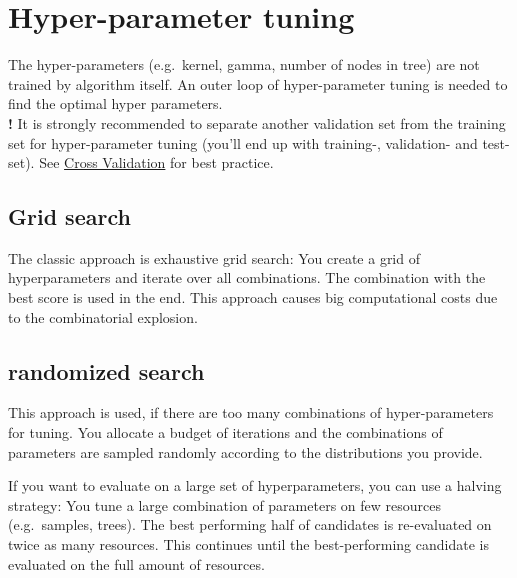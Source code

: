 \documentclass[
]{book}
\begin{document}
\hypertarget{hyper-parameter-tuning}{%
\section{Hyper-parameter tuning}\label{hyper-parameter-tuning}}

The hyper-parameters (e.g.~kernel, gamma, number of nodes in tree) are
not trained by algorithm itself. An outer loop of hyper-parameter tuning
is needed to find the optimal hyper parameters.\\
\textbf{!} It is strongly recommended to separate another validation set from
the training set for hyper-parameter tuning (you'll end up with
training-, validation- and test-set). See \protect\hyperlink{crossval}{Cross Validation}
for best practice.

\hypertarget{grid-search}{%
\subsection{Grid search}\label{grid-search}}

The classic approach is exhaustive grid search: You create a grid of
hyperparameters and iterate over all combinations. The combination with
the best score is used in the end. This approach causes big
computational costs due to the combinatorial explosion.

\hypertarget{randomized-search}{%
\subsection{randomized search}\label{randomized-search}}

This approach is used, if there are too many combinations of
hyper-parameters for tuning. You allocate a budget of iterations and the
combinations of parameters are sampled randomly according to the
distributions you provide.

If you want to evaluate on a large set of hyperparameters, you can use a
halving strategy: You tune a large combination of parameters on few
resources (e.g.~samples, trees). The best performing half of candidates
is re-evaluated on twice as many resources. This continues until the
best-performing candidate is evaluated on the full amount of resources.
\end{document}
